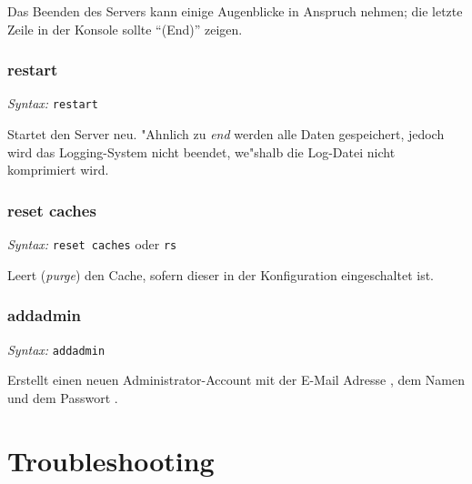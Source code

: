 Das Beenden des Servers kann einige Augenblicke
in Anspruch nehmen; die letzte Zeile in der
Konsole sollte ``(End)'' zeigen.

\subsubsection{restart}

\hspace*{2cm}\emph{Syntax: } \lstinline{restart}
\vspace*{0.2cm}

Startet den Server neu. "Ahnlich zu \emph{end}
werden alle Daten gespeichert, jedoch wird
das Logging-System nicht beendet, we"shalb
die Log-Datei nicht komprimiert wird.

\subsubsection{reset caches}

\hspace*{2cm}\emph{Syntax: } \lstinline{reset caches} oder \lstinline{rs}
\vspace*{0.2cm}

Leert (\emph{purge}) den Cache, sofern dieser
in der Konfiguration eingeschaltet ist.

\subsubsection{addadmin}

\hspace*{2cm}\emph{Syntax: } \lstinline{addadmin}   
\vspace*{0.2cm}

Erstellt einen neuen Administrator-Account mit
der E-Mail Adresse , dem Namen 
und dem Passwort .


\section{Troubleshooting}

